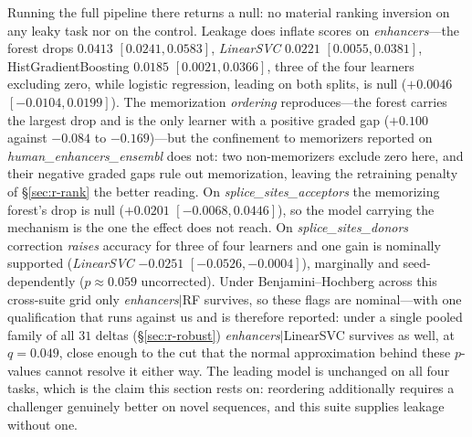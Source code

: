 \documentclass[webpdf,modern,large,namedate]{oup-authoring-template}%
\begin{document}
Running the full pipeline there returns a null: no material ranking inversion on any leaky task nor on the control. Leakage does inflate scores on \textit{enhancers}---the forest drops $0.0413$ $[0.0241,0.0583]$, \textit{LinearSVC} $0.0221$ $[0.0055,0.0381]$, HistGradientBoosting $0.0185$ $[0.0021,0.0366]$, three of the four learners excluding zero, while logistic regression, leading on both splits, is null ($+0.0046$ $[-0.0104,0.0199]$). The memorization \emph{ordering} reproduces---the forest carries the largest drop and is the only learner with a positive graded gap ($+0.100$ against $-0.084$ to $-0.169$)---but the confinement to memorizers reported on \textit{human\_enhancers\_ensembl} does not: two non-memorizers exclude zero here, and their negative graded gaps rule out memorization, leaving the retraining penalty of \S\ref{sec:r-rank} the better reading. On \textit{splice\_sites\_acceptors} the memorizing forest's drop is null ($+0.0201$ $[-0.0068,0.0446]$), so the model carrying the mechanism is the one the effect does not reach. On \textit{splice\_sites\_donors} correction \emph{raises} accuracy for three of four learners and one gain is nominally supported (\textit{LinearSVC} $-0.0251$ $[-0.0526,-0.0004]$), marginally and seed-dependently ($p\approx0.059$ uncorrected). Under Benjamini--Hochberg across this cross-suite grid only \textit{enhancers}$|$RF survives, so these flags are nominal---with one qualification that runs against us and is therefore reported: under a single pooled family of all $31$ deltas (\S\ref{sec:r-robust}) \textit{enhancers}$|$LinearSVC survives as well, at $q=0.049$, close enough to the cut that the normal approximation behind these $p$-values cannot resolve it either way. The leading model is unchanged on all four tasks, which is the claim this section rests on: reordering additionally requires a challenger genuinely better on novel sequences, and this suite supplies leakage without one.
\end{document}
